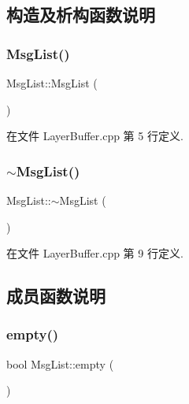 \subsection{构造及析构函数说明}
\mbox{\label{class_msg_list_a46c9731fd0aff048b28f4e40a2731cad}} 
\subsubsection{\texorpdfstring{Msg\+List()}{MsgList()}}
{\footnotesize\ttfamily Msg\+List\+::\+Msg\+List (\begin{DoxyParamCaption}{ }\end{DoxyParamCaption})}



在文件 Layer\+Buffer.\+cpp 第 5 行定义.

\mbox{\label{class_msg_list_af9729fa556cbf008c88287e7af6e9b47}} 
\subsubsection{\texorpdfstring{$\sim$\+Msg\+List()}{~MsgList()}}
{\footnotesize\ttfamily Msg\+List\+::$\sim$\+Msg\+List (\begin{DoxyParamCaption}{ }\end{DoxyParamCaption})}



在文件 Layer\+Buffer.\+cpp 第 9 行定义.



\subsection{成员函数说明}
\mbox{\label{class_msg_list_a04cda4a2294100a9f56b7957e29ef40c}} 
\subsubsection{\texorpdfstring{empty()}{empty()}}
{\footnotesize\ttfamily bool Msg\+List\+::empty (\begin{DoxyParamCaption}{ }\end{DoxyParamCaption})}

